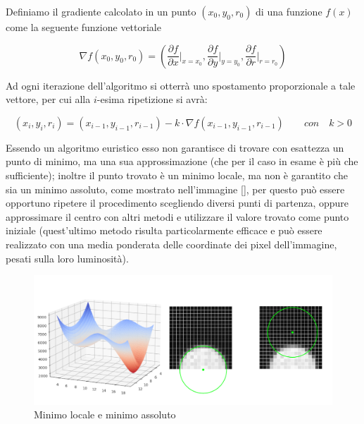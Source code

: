 \documentclass[12pt]{article}
\begin{document}
        
        Definiamo il gradiente calcolato in un punto $(x_0, y_0, r_0)$ di una funzione $f(x)$ come la seguente funzione vettoriale
        
        \begin{equation}
            \nabla f (x_0, y_0, r_0) = \left( \frac{\partial f}{\partial x} \bigg\rvert_{x = x_0}, \frac{\partial f}{\partial y} \bigg\rvert_{y = y_0}, \frac{\partial f}{\partial r} \bigg\rvert_{r = r_0} \right)
        \end{equation}
        
        
        Ad ogni iterazione dell'algoritmo si otterrà uno spostamento proporzionale a tale vettore, per cui alla $i$-esima ripetizione si avrà:
         
        \begin{equation}
            (x_i, y_i, r_i) = (x_{i-1}, y_{i-1}, r_{i-1}) - k \cdot \nabla f (x_{i-1}, y_{i-1}, r_{i-1}) \qquad con \quad k > 0
        \end{equation}
        
        Essendo un algoritmo euristico esso non garantisce di trovare con esattezza un punto di minimo, ma una sua approssimazione (che per il caso in esame è più che sufficiente); inoltre il punto trovato è un minimo locale, ma non è garantito che sia un minimo assoluto, come mostrato nell'immagine \ref{}, per questo può essere opportuno ripetere il procedimento scegliendo diversi punti di partenza, oppure approssimare il centro con altri metodi e utilizzare il valore trovato come punto iniziale (quest'ultimo metodo risulta particolarmente efficace e può essere realizzato con una media ponderata delle coordinate dei pixel dell'immagine, pesati sulla loro luminosità).
        
        \begin{figure}[h]
        \centering
            \includegraphics[width=\textwidth-30pt]{Draws/matplotlib_draws/double_min_block.png}
            \caption{Minimo locale e minimo assoluto}
            \label{double_min}
        \end{figure}
        
\end{document}
